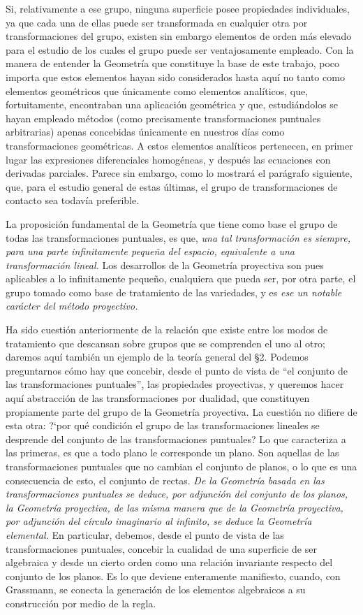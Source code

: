 \documentclass[a4paper, 12pt]{article}
\begin{document}
Si, relativamente a ese grupo, ninguna superficie posee propiedades individuales, ya que cada una de ellas puede ser transformada en cualquier otra por transformaciones del grupo, existen sin embargo elementos de orden más elevado para el estudio de los cuales el grupo puede ser ventajosamente empleado. Con la manera de entender la Geometría que constituye la base de este trabajo, poco importa que estos elementos hayan sido considerados hasta aquí no tanto como elementos geométricos que únicamente como elementos analíticos, que, fortuitamente, encontraban una aplicación geométrica y que, estudiándolos se hayan empleado métodos (como precisamente transformaciones puntuales arbitrarias) apenas concebidas únicamente en nuestros días como transformaciones geométricas. A estos elementos analíticos pertenecen, en primer lugar las expresiones diferenciales homogéneas, y después las ecuaciones con derivadas parciales. Parece sin embargo, como lo mostrará el parágrafo siguiente, que, para el estudio general de estas últimas, el grupo de transformaciones de contacto sea todavía preferible.

La proposición fundamental de la Geometría que tiene como base el grupo de todas las transformaciones puntuales, es que, \textit{una tal transformación es siempre, para una parte infinitamente pequeña del espacio, equivalente a una transformación lineal.} Los desarrollos de la Geometría proyectiva son pues aplicables a lo infinitamente pequeño, cualquiera que pueda ser, por otra parte, el grupo tomado como base de tratamiento de las variedades, y es \textit{ese un notable carácter del método proyectivo.}



Ha sido cuestión anteriormente de la relación que existe entre los modos de tratamiento que descansan sobre grupos que se comprenden el uno al otro; daremos aquí también un ejemplo de la teoría general del {\S}2. Podemos preguntarnos cómo hay que concebir, desde el punto de vista de ``el conjunto de las transformaciones puntuales'', las propiedades proyectivas, y queremos hacer aquí abstracción de las transformaciones por dualidad, que constituyen propiamente parte del grupo de la Geometría proyectiva. La cuestión no difiere de esta otra: ?`por qué condición el grupo de las transformaciones lineales se desprende del conjunto de las transformaciones puntuales? Lo que caracteriza a las primeras, es que a todo plano le corresponde un plano. Son aquellas de las transformaciones puntuales que no cambian el conjunto de planos, o lo que es una consecuencia de esto, el conjunto de rectas. \textit{De la Geometría basada en las transformaciones puntuales se deduce, por adjunción del conjunto de los planos, la Geometría proyectiva, de las misma manera que de la Geometría proyectiva, por adjunción del círculo imaginario al infinito, se deduce la Geometría elemental.} En particular, debemos, desde el punto de vista de las transformaciones puntuales, concebir la cualidad de una superficie de ser algebraica y desde un cierto orden como una relación invariante respecto del conjunto de los planos. Es lo que deviene enteramente manifiesto, cuando, con Grassmann, se conecta la generación de los elementos algebraicos a su construcción por medio de la regla. 
\end{document}
